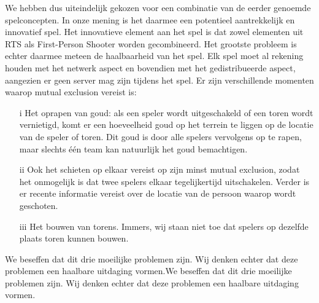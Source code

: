 We hebben dus uiteindelijk gekozen voor een combinatie van de eerder genoemde spelconcepten. In onze mening is het daarmee een potentieel aantrekkelijk en innovatief spel. Het innovatieve element aan het spel is dat zowel elementen uit RTS als First-Person Shooter worden gecombineerd. Het grootste probleem is echter daarmee meteen de haalbaarheid van het spel. Elk spel moet al rekening houden met het netwerk aspect en bovendien met het gedistribueerde aspect, aangezien er geen server mag zijn tijdens het spel. Er zijn verschillende momenten waarop mutual exclusion vereist is:

\begin{enumerate}
\item[i] Het oprapen van goud: als een speler wordt uitgeschakeld of een toren wordt vernietigd, komt er een hoeveelheid goud op het terrein te liggen op de locatie van de speler of toren. Dit goud is door alle spelers vervolgens op te rapen, maar slechts \'e\'en team kan natuurlijk het goud bemachtigen.
\item[ii] Ook het schieten op elkaar vereist op zijn minst mutual exclusion, zodat het onmogelijk is dat twee spelers elkaar tegelijkertijd uitschakelen. Verder is er recente informatie vereist over de locatie van de persoon waarop wordt geschoten.
\item[iii] Het bouwen van torens. Immers, wij staan niet toe dat spelers op dezelfde plaats toren kunnen bouwen.
\end{enumerate}

We beseffen dat dit drie moeilijke problemen zijn. Wij denken echter dat deze problemen een haalbare uitdaging vormen.We beseffen dat dit drie moeilijke problemen zijn. Wij denken echter dat deze problemen een haalbare uitdaging vormen.
